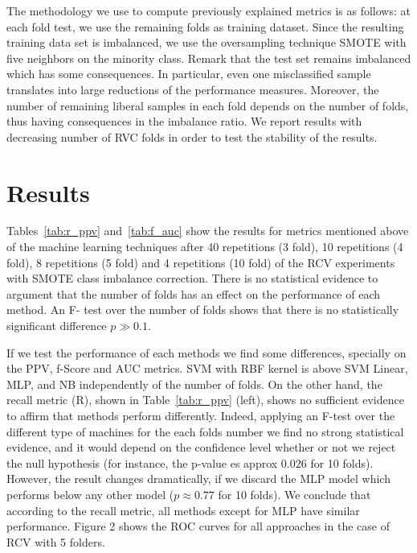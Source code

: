 \documentclass[10pt,leqno]{amsart}
\begin{document}
The methodology we use to compute previously explained metrics is as follows: at each fold test, we use the remaining folds as training dataset. Since the resulting training data set is imbalanced, we use the oversampling technique SMOTE with five neighbors on the minority class. Remark that the test set remains imbalanced which has some consequences. In particular, even one misclassified sample translates into large reductions of the performance measures. Moreover, the number of remaining liberal samples in each fold depends on the number of folds, thus having consequences in the imbalance ratio. We report results with decreasing number of RVC folds in order to test the stability of the results.

\section{Results}

Tables~\ref{tab:r_ppv} and~\ref{tab:f_auc} show the results for  metrics mentioned above of the machine learning techniques after 40 repetitions (3 fold), 10 repetitions (4 fold), 8 repetitions (5 fold) and 4 repetitions (10 fold) of the RCV experiments with SMOTE class imbalance correction. There is no statistical evidence to argument that the number of folds has an effect on the performance of each method. An F- test over the number of folds shows that there is no statistically significant difference $p\gg0.1$.

If we test the performance of each methods we find some differences, specially on the PPV, f-Score and AUC metrics. SVM with RBF kernel is above SVM Linear, MLP, and NB independently of the number of folds. On the other hand, the recall metric (R), shown in Table~\ref{tab:r_ppv} (left), shows no sufficient evidence to affirm that methods perform differently. Indeed, applying an F-test over the different type of machines for the each folds number we find no strong statistical evidence, and it would depend on the confidence level whether or not we reject the null hypothesis  (for instance, the p-value es approx $0.026$ for 10 folds). However, the result changes dramatically, if we discard the MLP model which performs below any other model ($p\approx0.77$ for 10 folds). We conclude that according to the recall metric, all methods except for MLP have similar performance. Figure 2 shows the ROC curves for all approaches in the case of RCV with 5 folders.
\end{document}
